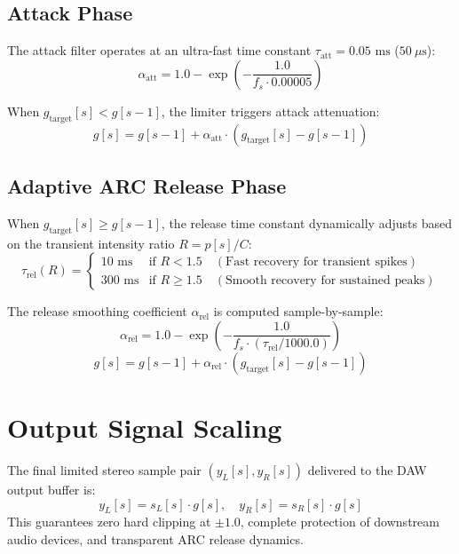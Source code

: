 \documentclass[11pt,a4paper]{article}
\begin{document}
\subsection{Attack Phase}
The attack filter operates at an ultra-fast time constant $\tau_{\text{att}} = 0.05 \text{ ms}$ ($50 \ \mu\text{s}$):
\begin{equation}
\alpha_{\text{att}} = 1.0 - \exp\left(-\frac{1.0}{f_s \cdot 0.00005}\right)
\end{equation}

When $g_{\text{target}}[s] < g[s-1]$, the limiter triggers attack attenuation:
\begin{equation}
g[s] = g[s-1] + \alpha_{\text{att}} \cdot (g_{\text{target}}[s] - g[s-1])
\end{equation}

\subsection{Adaptive ARC Release Phase}
When $g_{\text{target}}[s] \ge g[s-1]$, the release time constant dynamically adjusts based on the transient intensity ratio $R = p[s] / C$:
\begin{equation}
\tau_{\text{rel}}(R) = \begin{cases}
10 \text{ ms} & \text{if } R < 1.5 \quad (\text{Fast recovery for transient spikes}) \\
300 \text{ ms} & \text{if } R \ge 1.5 \quad (\text{Smooth recovery for sustained peaks})
\end{cases}
\end{equation}

The release smoothing coefficient $\alpha_{\text{rel}}$ is computed sample-by-sample:
\begin{equation}
\alpha_{\text{rel}} = 1.0 - \exp\left(-\frac{1.0}{f_s \cdot (\tau_{\text{rel}} / 1000.0)}\right)
\end{equation}
\begin{equation}
g[s] = g[s-1] + \alpha_{\text{rel}} \cdot (g_{\text{target}}[s] - g[s-1])
\end{equation}

\section{Output Signal Scaling}
The final limited stereo sample pair $(y_L[s], y_R[s])$ delivered to the DAW output buffer is:
\begin{equation}
y_L[s] = s_L[s] \cdot g[s], \quad y_R[s] = s_R[s] \cdot g[s]
\end{equation}
This guarantees zero hard clipping at $\pm 1.0$, complete protection of downstream audio devices, and transparent ARC release dynamics.
\end{document}
